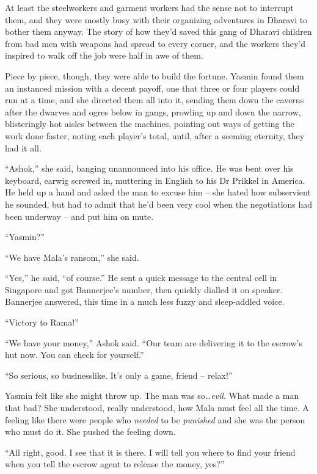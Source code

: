 At least the steelworkers and garment workers had the sense not to
interrupt them, and they were mostly busy with their organizing
adventures in Dharavi to bother them anyway. The story of how
they'd saved this gang of Dharavi children from bad men with
weapons had spread to every corner, and the workers they'd inspired
to walk off the job were half in awe of them.

Piece by piece, though, they were able to build the fortune. Yasmin
found them an instanced mission with a decent payoff, one that
three or four players could run at a time, and she directed them
all into it, sending them down the caverns after the dwarves and
ogres below in gangs, prowling up and down the narrow, blisteringly
hot aisles between the machines, pointing out ways of getting the
work done faster, noting each player's total, until, after a
seeming eternity, they had it all.

``Ashok,'' she said, banging unannounced into his office. He was bent
over his keyboard, earwig screwed in, muttering in English to his
Dr Prikkel in America. He held up a hand and asked the man to
excuse him -- she hated how subservient he sounded, but had to
admit that he'd been very cool when the negotiations had been
underway -- and put him on mute.

``Yasmin?''

``We have Mala's ransom,'' she said.

``Yes,'' he said, ``of course.'' He sent a quick message to the central
cell in Singapore and got Bannerjee's number, then quickly dialled
it on speaker. Bannerjee answered, this time in a much less fuzzy
and sleep-addled voice.

``Victory to Rama!''

``We have your money,'' Ashok said. ``Our team are delivering it to
the escrow's hut now. You can check for yourself.''

``So serious, so businesslike. It's only a game, friend -- relax!''

Yasmin felt like she might throw up. The man was so\ldots{}\emph{evil}.
What made a man that bad? She understood, really understood, how
Mala must feel all the time. A feeling like there were people who
\emph{needed} to be \emph{punished} and she was the person who must
do it. She pushed the feeling down.

``All right, good. I see that it is there. I will tell you where to
find your friend when you tell the escrow agent to release the
money, yes?''

